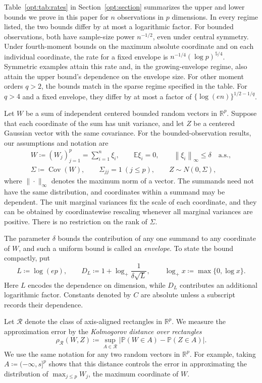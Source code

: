 \documentclass[11pt,letterpaper]{article}
\theoremstyle{remark}
\newcommand{\E}{\mathbb E}
\newcommand{\Pp}{\mathbb P}
\newcommand{\R}{\mathbb R}
\newcommand{\Cov}{\operatorname{Cov}}
\newcommand{\norm}[1]{\left\lVert#1\right\rVert}
\newcommand{\rh}{\rho_{\mathcal R}}
\begin{document}
Table~\ref{opt:tab:rates} in Section~\ref{opt:section} summarizes the upper
and lower bounds we prove in this paper for \(n\) observations in \(p\)
dimensions. In every regime listed, the two bounds differ by at most a
logarithmic factor. For bounded observations, both have sample-size
power \(n^{-1/2}\), even under central symmetry. Under fourth-moment
bounds on the maximum absolute coordinate and on each individual
coordinate, the rate for a fixed envelope is
\(n^{-1/4}(\log p)^{5/4}\). Symmetric examples attain this rate and, in
the growing-envelope regime, also attain the upper bound's dependence on
the envelope size. For other moment orders \(q>2\), the bounds match in
the sparse regime specified in the table. For \(q>4\) and a fixed envelope,
they differ by at most a factor of \(\{\log(en)\}^{1/2-1/q}\).

Let \(W\) be a sum of independent centered bounded random vectors in
\(\R^p\). Suppose that each coordinate of the sum has unit variance,
and let \(Z\) be a centered Gaussian vector with the same covariance.
For the bounded-observation results, our assumptions and notation are
\begin{equation}
 \begin{gathered}
 W\coloneqq (W_j)_{j=1}^p=\sum_{i=1}^n\xi_i,\qquad
 \E\xi_i=0,\qquad \norm{\xi_i}_\infty\le\delta\quad\text{a.s.},\\
 \Sigma\coloneqq \Cov(W),\qquad\Sigma_{jj}=1\ (j\le p),
 \qquad Z\sim N(0,\Sigma),
 \end{gathered}
 \label{eq:setup}
\end{equation}
where $\|\cdot\|_\infty$ denotes the maximum norm of a vector. 
The summands need not have the same distribution, and coordinates within
a summand may be dependent. The unit marginal variances fix the scale
of each coordinate, and they can be obtained by coordinatewise rescaling
whenever all marginal variances are positive. There is no
restriction on the rank of \(\Sigma\).

The parameter \(\delta\) bounds the contribution of any one summand
to any coordinate of \(W\), and such a uniform bound is called an
\emph{envelope}. To state the
bound compactly, put
\[
 L\coloneqq \log(ep),\qquad
 D_L\coloneqq 1+\log_+\frac1{\delta\sqrt L},\qquad
 \log_+x\coloneqq \max\{0,\log x\}.
\]
Here \(L\) encodes the dependence on dimension, while \(D_L\)
contributes an additional logarithmic factor. Constants denoted by
\(C\) are absolute unless a subscript records their dependence.

Let \(\mathcal R\) denote the class of axis-aligned rectangles in
\(\R^p\). We measure the approximation error by the \emph{Kolmogorov distance over rectangles}
\[
 \rh(W,Z)\coloneqq \sup_{A\in\mathcal R}
       |\Pp(W\in A)-\Pp(Z\in A)|.
\]
We use the same notation for any two random vectors in \(\R^p\). For
example, taking \(A\coloneqq (-\infty,s]^p\) shows that this distance controls the
error in approximating the distribution of \(\max_{j\le p}W_j\), the maximum
coordinate of \(W\).
\end{document}
